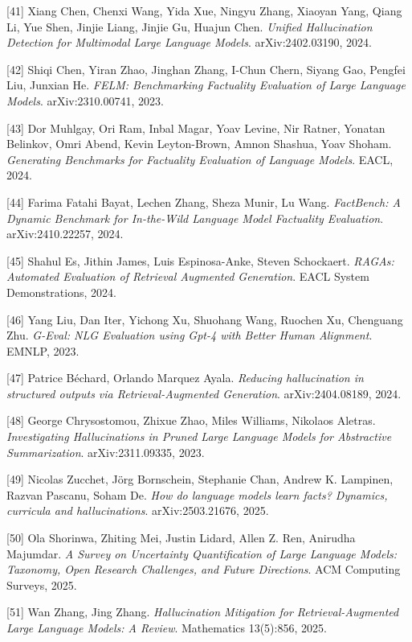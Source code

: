 {[}41{]} Xiang Chen, Chenxi Wang, Yida Xue, Ningyu Zhang, Xiaoyan Yang, Qiang Li, Yue Shen, Jinjie Liang, Jinjie Gu, Huajun Chen. \emph{Unified Hallucination Detection for Multimodal Large Language Models}. arXiv:2402.03190, 2024.

{[}42{]} Shiqi Chen, Yiran Zhao, Jinghan Zhang, I-Chun Chern, Siyang Gao, Pengfei Liu, Junxian He. \emph{FELM: Benchmarking Factuality Evaluation of Large Language Models}. arXiv:2310.00741, 2023.

{[}43{]} Dor Muhlgay, Ori Ram, Inbal Magar, Yoav Levine, Nir Ratner, Yonatan Belinkov, Omri Abend, Kevin Leyton-Brown, Amnon Shashua, Yoav Shoham. \emph{Generating Benchmarks for Factuality Evaluation of Language Models}. EACL, 2024.

{[}44{]} Farima Fatahi Bayat, Lechen Zhang, Sheza Munir, Lu Wang. \emph{FactBench: A Dynamic Benchmark for In-the-Wild Language Model Factuality Evaluation}. arXiv:2410.22257, 2024.

{[}45{]} Shahul Es, Jithin James, Luis Espinosa-Anke, Steven Schockaert. \emph{RAGAs: Automated Evaluation of Retrieval Augmented Generation}. EACL System Demonstrations, 2024.

{[}46{]} Yang Liu, Dan Iter, Yichong Xu, Shuohang Wang, Ruochen Xu, Chenguang Zhu. \emph{G-Eval: NLG Evaluation using Gpt-4 with Better Human Alignment}. EMNLP, 2023.

{[}47{]} Patrice Béchard, Orlando Marquez Ayala. \emph{Reducing hallucination in structured outputs via Retrieval-Augmented Generation}. arXiv:2404.08189, 2024.

{[}48{]} George Chrysostomou, Zhixue Zhao, Miles Williams, Nikolaos Aletras. \emph{Investigating Hallucinations in Pruned Large Language Models for Abstractive Summarization}. arXiv:2311.09335, 2023.

{[}49{]} Nicolas Zucchet, Jörg Bornschein, Stephanie Chan, Andrew K. Lampinen, Razvan Pascanu, Soham De. \emph{How do language models learn facts? Dynamics, curricula and hallucinations}. arXiv:2503.21676, 2025.

{[}50{]} Ola Shorinwa, Zhiting Mei, Justin Lidard, Allen Z. Ren, Anirudha Majumdar. \emph{A Survey on Uncertainty Quantification of Large Language Models: Taxonomy, Open Research Challenges, and Future Directions}. ACM Computing Surveys, 2025.

{[}51{]} Wan Zhang, Jing Zhang. \emph{Hallucination Mitigation for Retrieval-Augmented Large Language Models: A Review}. Mathematics 13(5):856, 2025.

